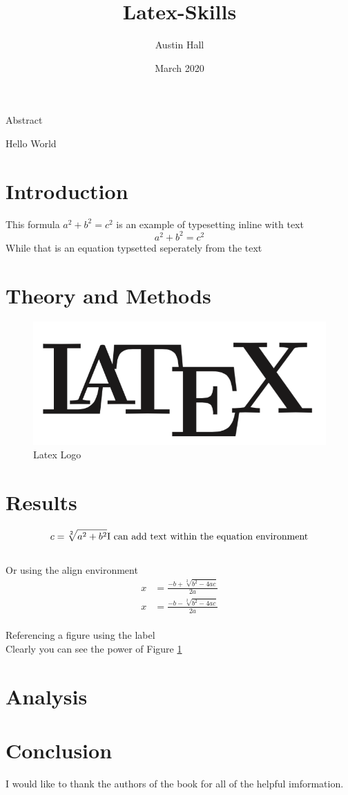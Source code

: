 \documentclass{article}
\author{\huge Austin Hall}
\date{\huge March 2020}
\title{\Huge Latex-Skills}
\begin{document}
\maketitle
\begin{center}
{\LARGE Abstract}\\
\end{center}
Hello World


\newpage
\section{Introduction}
This formula $a^2+b^2=c^2$ is an example of typesetting inline with text
\begin{equation}
a^2+b^2=c^2
\end{equation}
While that is an equation typsetted seperately from the text

\newpage
\section{Theory and Methods}
\begin{figure}[h!]
\centering{}
\includegraphics[scale=0.5]{logo.png}
\caption{Latex Logo}
\label{fig:logo}
\end{figure}


\newpage
\section{Results}
\begin{equation}
c=\sqrt[2]{a^2+b^2}\\
\text{\\ I can add text within the equation environment}
\end{equation}
\\Or using the align environment
\begin{align}
x&=\frac{-b+\sqrt[2]{b^2-4ac}}{2a}
\\x&=\frac{-b-\sqrt[2]{b^2-4ac}}{2a}
\end{align}
\\Referencing a figure using the label
\\Clearly you can see the power of Figure \ref{fig:logo}
\newpage
\section{Analysis}


\newpage
\section{Conclusion}
I would like to thank the authors of the book \cite{Scopatz2015} for all of the helpful imformation.

\newpage


\end{document}
